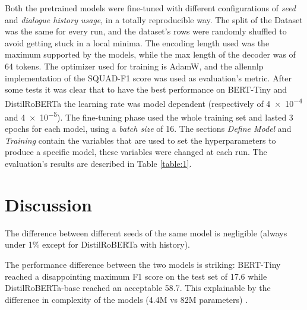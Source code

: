 \documentclass[11pt]{article}
\begin{document}
Both the pretrained models were fine-tuned with different configurations of \textit{seed} and \textit{dialogue history usage}, in a totally reproducible way.
The split of the Dataset was the same for every run, and the dataset's rows were randomly shuffled to avoid getting stuck in a local minima. The encoding length used was the maximum supported by the models, while the max length of the decoder was of 64 tokens.
The optimizer used for training is AdamW, and the allennlp implementation of the SQUAD-F1 score was used as evaluation's metric. 
After some tests it was clear that to have the best performance on BERT-Tiny and DistilRoBERTa the learning rate was model dependent (respectively of \num{4e-4} and \num{4e-5}). The fine-tuning phase used the whole training set and lasted 3 epochs for each model, using a \textit{batch size} of 16. The sections \textit{Define Model} and \textit{Training} contain the variables that are used to set the hyperparameters to produce a specific model, these variables were changed at each run.
The evaluation's results are described in Table \ref{table:1}.

\section{Discussion}
\label{sec:discussion}



The difference between different seeds of the same model is negligible (always under 1\% except for DistilRoBERTa with history).

The performance difference between the two models is striking: BERT-Tiny reached a disappointing maximum F1 score on the test set of 17.6 while DistilRoBERTa-base reached an acceptable 58.7. This explainable by the difference in complexity of the models (4.4M vs 82M parameters) \cite{turc2019wellread}\cite{sanh2020distilbert}.
\end{document}
